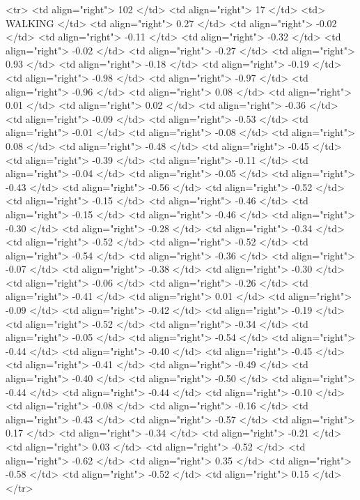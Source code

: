   <tr> <td align="right"> 102 </td> <td align="right">  17 </td> <td> WALKING </td> <td align="right"> 0.27 </td> <td align="right"> -0.02 </td> <td align="right"> -0.11 </td> <td align="right"> -0.32 </td> <td align="right"> -0.02 </td> <td align="right"> -0.27 </td> <td align="right"> 0.93 </td> <td align="right"> -0.18 </td> <td align="right"> -0.19 </td> <td align="right"> -0.98 </td> <td align="right"> -0.97 </td> <td align="right"> -0.96 </td> <td align="right"> 0.08 </td> <td align="right"> 0.01 </td> <td align="right"> 0.02 </td> <td align="right"> -0.36 </td> <td align="right"> -0.09 </td> <td align="right"> -0.53 </td> <td align="right"> -0.01 </td> <td align="right"> -0.08 </td> <td align="right"> 0.08 </td> <td align="right"> -0.48 </td> <td align="right"> -0.45 </td> <td align="right"> -0.39 </td> <td align="right"> -0.11 </td> <td align="right"> -0.04 </td> <td align="right"> -0.05 </td> <td align="right"> -0.43 </td> <td align="right"> -0.56 </td> <td align="right"> -0.52 </td> <td align="right"> -0.15 </td> <td align="right"> -0.46 </td> <td align="right"> -0.15 </td> <td align="right"> -0.46 </td> <td align="right"> -0.30 </td> <td align="right"> -0.28 </td> <td align="right"> -0.34 </td> <td align="right"> -0.52 </td> <td align="right"> -0.52 </td> <td align="right"> -0.54 </td> <td align="right"> -0.36 </td> <td align="right"> -0.07 </td> <td align="right"> -0.38 </td> <td align="right"> -0.30 </td> <td align="right"> -0.06 </td> <td align="right"> -0.26 </td> <td align="right"> -0.41 </td> <td align="right"> 0.01 </td> <td align="right"> -0.09 </td> <td align="right"> -0.42 </td> <td align="right"> -0.19 </td> <td align="right"> -0.52 </td> <td align="right"> -0.34 </td> <td align="right"> -0.05 </td> <td align="right"> -0.54 </td> <td align="right"> -0.44 </td> <td align="right"> -0.40 </td> <td align="right"> -0.45 </td> <td align="right"> -0.41 </td> <td align="right"> -0.49 </td> <td align="right"> -0.40 </td> <td align="right"> -0.50 </td> <td align="right"> -0.44 </td> <td align="right"> -0.44 </td> <td align="right"> -0.10 </td> <td align="right"> -0.08 </td> <td align="right"> -0.16 </td> <td align="right"> -0.43 </td> <td align="right"> -0.57 </td> <td align="right"> 0.17 </td> <td align="right"> -0.34 </td> <td align="right"> -0.21 </td> <td align="right"> 0.03 </td> <td align="right"> -0.52 </td> <td align="right"> -0.62 </td> <td align="right"> 0.35 </td> <td align="right"> -0.58 </td> <td align="right"> -0.52 </td> <td align="right"> 0.15 </td> </tr>
